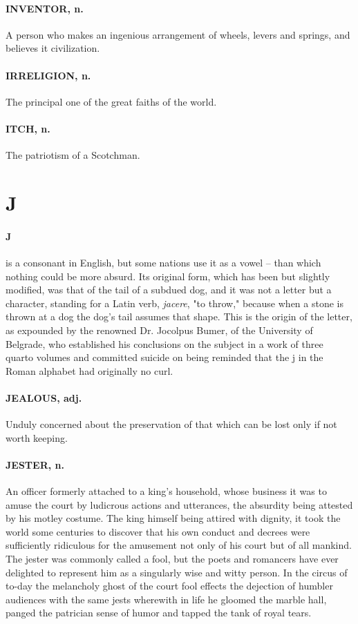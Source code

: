 \documentclass[11pt]{article}
\begin{document}
\paragraph{INVENTOR, n.}  A person who makes an ingenious arrangement of wheels,
levers and springs, and believes it civilization.

\paragraph{IRRELIGION, n.}  The principal one of the great faiths of the world.

\paragraph{ITCH, n.}  The patriotism of a Scotchman.



\section*{J}



\paragraph{J} is a consonant in English, but some nations use it as a vowel --
than which nothing could be more absurd.  Its original form, which has
been but slightly modified, was that of the tail of a subdued dog, and
it was not a letter but a character, standing for a Latin verb,
{\em jacere}, "to throw," because when a stone is thrown at a dog the
dog's tail assumes that shape.  This is the origin of the letter, as
expounded by the renowned Dr. Jocolpus Bumer, of the University of
Belgrade, who established his conclusions on the subject in a work of
three quarto volumes and committed suicide on being reminded that the
j in the Roman alphabet had originally no curl.

\paragraph{JEALOUS, adj.}  Unduly concerned about the preservation of that which
can be lost only if not worth keeping.

\paragraph{JESTER, n.}  An officer formerly attached to a king's household, whose
business it was to amuse the court by ludicrous actions and
utterances, the absurdity being attested by his motley costume.  The
king himself being attired with dignity, it took the world some
centuries to discover that his own conduct and decrees were
sufficiently ridiculous for the amusement not only of his court but of
all mankind.  The jester was commonly called a fool, but the poets and
romancers have ever delighted to represent him as a singularly wise
and witty person.  In the circus of to-day the melancholy ghost of the
court fool effects the dejection of humbler audiences with the same
jests wherewith in life he gloomed the marble hall, panged the
patrician sense of humor and tapped the tank of royal tears.
\end{document}
